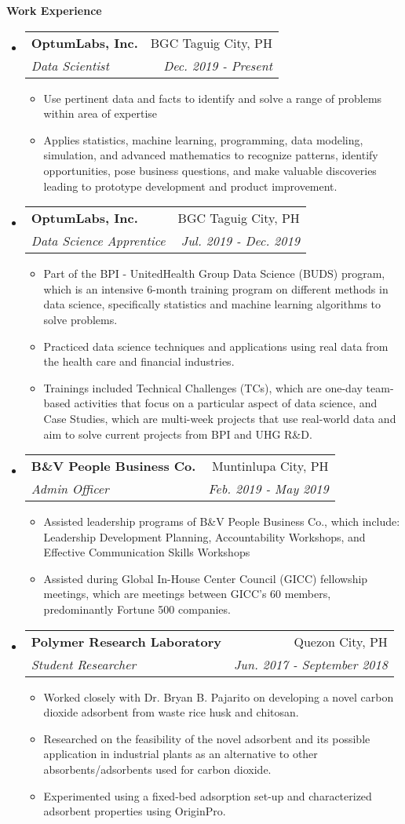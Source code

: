 \documentclass[letterpaper,11pt]{article}
\makeatletter
\newcommand{\resitem}[1]{\item #1 \vspace{-2pt}}
\newcommand{\resheading}[1]{{\large \colorbox{mygrey}{\begin{minipage}{\textwidth}{\textbf{#1 \vphantom{p\^{E}}}}\end{minipage}}}}
\newcommand{\ressubheading}[4]{
\begin{tabular*}{6.55in}{l@{\extracolsep{\fill}}r}
		\textbf{#1} & #2 \\
		\textit{#3} & \textit{#4} \\
\end{tabular*}\vspace{-6pt}}
\makeatother
\begin{document}
\resheading{Work Experience}
\begin{itemize}
\item
	\ressubheading{OptumLabs, Inc.}{BGC Taguig City, PH}{Data Scientist}{Dec. 2019 - Present}
	\begin{itemize}
		\resitem{Use pertinent data and facts to identify and solve a range of problems within area of expertise}
		\resitem{Applies statistics, machine learning, programming, data modeling, simulation, and advanced mathematics to recognize patterns, 
		identify opportunities, pose business questions, and make valuable discoveries leading to prototype development and product improvement.}
	\end{itemize}
\item
	\ressubheading{OptumLabs, Inc.}{BGC Taguig City, PH}{Data Science Apprentice}{Jul. 2019 - Dec. 2019}
	\begin{itemize}
		\resitem{Part of the BPI - UnitedHealth Group Data Science (BUDS) program, which is an intensive 6-month training program on different methods 
		in data science, specifically statistics and machine learning algorithms to solve problems.}
		\resitem{Practiced data science techniques and applications using real data from the health care and financial industries.}
		\resitem{Trainings included Technical Challenges (TCs), which are one-day team-based activities that focus on a particular aspect of data science, and Case Studies, 
		which are multi-week projects that use real-world data and aim to solve current projects from BPI and UHG R\&D.}
	\end{itemize}
\item
	\ressubheading{B\&V People Business Co.}{Muntinlupa City, PH}{Admin Officer}{Feb. 2019 - May 2019}
	\begin{itemize}
		\resitem{Assisted leadership programs of B\&V People Business Co., which include: Leadership Development Planning, 
		Accountability Workshops, and Effective Communication Skills Workshops}
		\resitem{Assisted during Global In-House Center Council (GICC) fellowship meetings, which are meetings between GICC’s 60 members, predominantly Fortune 500 companies.}
	\end{itemize}
	\pagebreak
\item
	\ressubheading{Polymer Research Laboratory}{Quezon City, PH}{Student Researcher}{Jun. 2017 - September 2018}
	\begin{itemize}
		\resitem{Worked closely with Dr. Bryan B. Pajarito on developing a novel carbon dioxide  adsorbent from waste rice husk and chitosan.}
		\resitem{Researched on the feasibility of the novel adsorbent and its possible application in industrial plants as an alternative to other absorbents/adsorbents used for carbon dioxide.}
		\resitem{Experimented using a fixed-bed adsorption set-up and characterized adsorbent properties using OriginPro.}
    \end{itemize}

\end{itemize}
\end{document}
